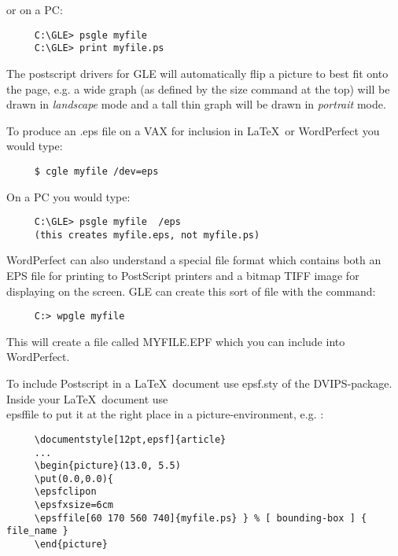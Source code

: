 or on a PC:
\begin{verbatim}
     C:\GLE> psgle myfile   
     C:\GLE> print myfile.ps 
\end{verbatim}

The postscript drivers for GLE will automatically flip a 
picture to best fit onto the page,  e.g. a wide graph
(as defined by the size command at the top) will be drawn 
in {\em landscape} mode and a tall thin graph will be drawn in
{\em portrait} mode.

To produce an .eps file on a VAX for inclusion in \LaTeX \ or 
WordPerfect you would type:
\begin{verbatim}
     $ cgle myfile /dev=eps
\end{verbatim}

On a PC you would type:
\begin{verbatim}
     C:\GLE> psgle myfile  /eps
     (this creates myfile.eps, not myfile.ps)
\end{verbatim}

WordPerfect can also understand a special file format which contains
both an EPS file for printing to PostScript printers and a bitmap  TIFF 
image for displaying on the screen.  GLE can create this sort of 
file with the command:
\begin{verbatim}
     C:> wpgle myfile
\end{verbatim}
This will create a file called MYFILE.EPF which you can include into
WordPerfect.

To include Postscript in a \LaTeX \ document use epsf.sty of the 
{\sf DVIPS}-package.  
Inside your \LaTeX \ document use {\sf\\epsffile } to put it at the right
place in a {\sf picture}-environment, e.g. :
\begin{verbatim}
     \documentstyle[12pt,epsf]{article}
     ...
     \begin{picture}(13.0, 5.5)
     \put(0.0,0.0){
     \epsfclipon
     \epsfxsize=6cm
     \epsffile[60 170 560 740]{myfile.ps} } % [ bounding-box ] { file_name }
     \end{picture}
\end{verbatim}
	
